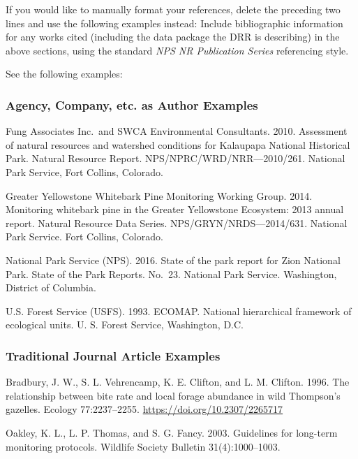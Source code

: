 \documentclass[
]{article}
\newlength{\cslhangindent}
\newlength{\cslentryspacingunit} %
\newenvironment{CSLReferences}[2] %
 {%
  \setlength{\parindent}{0pt}
  \ifodd #1
  \let\oldpar\par
  \def\par{\hangindent=\cslhangindent\oldpar}
  \fi
  \setlength{\parskip}{#2\cslentryspacingunit}
 }%
 {}
\begin{document}
\hypertarget{refs}{}
\begin{CSLReferences}{0}{0}
\end{CSLReferences}

If you would like to manually format your references, delete the
preceding two lines and use the following examples instead: Include
bibliographic information for any works cited (including the data
package the DRR is describing) in the above sections, using the standard
\emph{NPS NR Publication Series} referencing style.

See the following examples:

\hypertarget{agency-company-etc.-as-author-examples}{%
\subsubsection{Agency, Company, etc. as Author
Examples}\label{agency-company-etc.-as-author-examples}}

Fung Associates Inc.~and SWCA Environmental Consultants. 2010.
Assessment of natural resources and watershed conditions for Kalaupapa
National Historical Park. Natural Resource Report.
NPS/NPRC/WRD/NRR---2010/261. National Park Service, Fort Collins,
Colorado.

Greater Yellowstone Whitebark Pine Monitoring Working Group. 2014.
Monitoring whitebark pine in the Greater Yellowstone Ecosystem: 2013
annual report. Natural Resource Data Series. NPS/GRYN/NRDS---2014/631.
National Park Service. Fort Collins, Colorado.

National Park Service (NPS). 2016. State of the park report for Zion
National Park. State of the Park Reports. No.~23. National Park Service.
Washington, District of Columbia.

U.S. Forest Service (USFS). 1993. ECOMAP. National hierarchical
framework of ecological units. U. S. Forest Service, Washington, D.C.

\hypertarget{traditional-journal-article-examples}{%
\subsubsection{Traditional Journal Article
Examples}\label{traditional-journal-article-examples}}

Bradbury, J. W., S. L. Vehrencamp, K. E. Clifton, and L. M. Clifton.
1996. The relationship between bite rate and local forage abundance in
wild Thompson's gazelles. Ecology 77:2237--2255.
\url{https://doi.org/10.2307/2265717}

Oakley, K. L., L. P. Thomas, and S. G. Fancy. 2003. Guidelines for
long-term monitoring protocols. Wildlife Society Bulletin
31(4):1000--1003.
\end{document}
